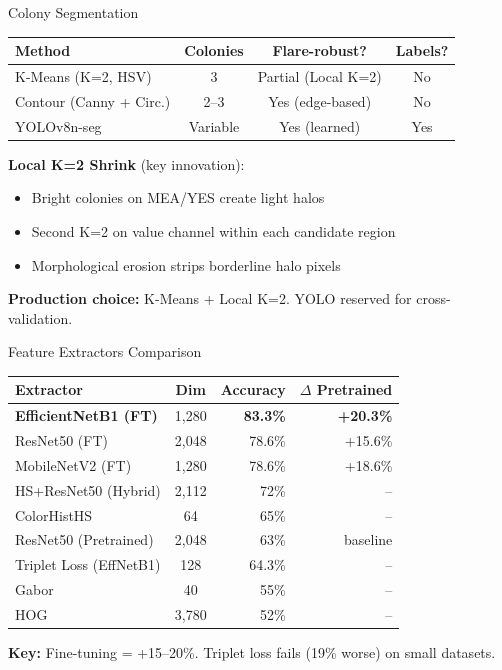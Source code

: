 \documentclass[aspectratio=169]{beamer}
\begin{document}
\begin{frame}{Colony Segmentation}
  \begin{table}
    \centering
    \begin{tabular}{@{}lccc@{}}
      \toprule
      \textbf{Method} & \textbf{Colonies} & \textbf{Flare-robust?} & \textbf{Labels?} \\
      \midrule
      K-Means (K=2, HSV) & 3 & Partial (Local K=2) & No \\
      Contour (Canny + Circ.) & 2--3 & Yes (edge-based) & No \\
      YOLOv8n-seg & Variable & Yes (learned) & Yes \\
      \bottomrule
    \end{tabular}
  \end{table}

  \textbf{Local K=2 Shrink} (key innovation):
  \begin{itemize}
    \item Bright colonies on MEA/YES create light halos
    \item Second K=2 on value channel within each candidate region
    \item Morphological erosion strips borderline halo pixels
  \end{itemize}

  {\small \textbf{Production choice:} K-Means + Local K=2. YOLO reserved for cross-validation.}
\end{frame}

\begin{frame}{Feature Extractors Comparison}
  \begin{table}
    \centering
    \small
    \begin{tabular}{@{}lcrr@{}}
      \toprule
      \textbf{Extractor} & \textbf{Dim} & \textbf{Accuracy} & \textbf{$\Delta$ Pretrained} \\
      \midrule
      \rowcolor{mycoLight!30}
      \textbf{EfficientNetB1 (FT)} & 1,280 & \textbf{83.3\%} & \textbf{+20.3\%} \\
      ResNet50 (FT) & 2,048 & 78.6\% & +15.6\% \\
      MobileNetV2 (FT) & 1,280 & 78.6\% & +18.6\% \\
      HS+ResNet50 (Hybrid) & 2,112 & 72\% & -- \\
      ColorHistHS & 64 & 65\% & -- \\
      ResNet50 (Pretrained) & 2,048 & 63\% & baseline \\
      Triplet Loss (EffNetB1) & 128 & 64.3\% & -- \\
      Gabor & 40 & 55\% & -- \\
      HOG & 3,780 & 52\% & -- \\
      \bottomrule
    \end{tabular}
  \end{table}
  \vspace{0.2em}
  \textbf{Key:} Fine-tuning = +15--20\%. Triplet loss fails (19\% worse) on small datasets.
\end{frame}
\end{document}
